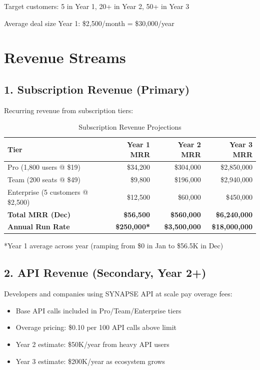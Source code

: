 \documentclass{report}
\begin{document}
Target customers: 5 in Year 1, 20+ in Year 2, 50+ in Year 3

Average deal size Year 1: \$2,500/month = \$30,000/year

\section{Revenue Streams}

\subsection{1. Subscription Revenue (Primary)}

Recurring revenue from subscription tiers:

\begin{table}[h]
\centering
\begin{tabular}{|l|r|r|r|}
\toprule
\textbf{Tier} & \textbf{Year 1 MRR} & \textbf{Year 2 MRR} & \textbf{Year 3 MRR} \\
\midrule
Pro (1,800 users @ \$19) & \$34,200 & \$304,000 & \$2,850,000 \\
Team (200 seats @ \$49) & \$9,800 & \$196,000 & \$2,940,000 \\
Enterprise (5 customers @ \$2,500) & \$12,500 & \$60,000 & \$450,000 \\
\midrule
\textbf{Total MRR (Dec)} & \textbf{\$56,500} & \textbf{\$560,000} & \textbf{\$6,240,000} \\
\textbf{Annual Run Rate} & \textbf{\$250,000*} & \textbf{\$3,500,000} & \textbf{\$18,000,000} \\
\bottomrule
\end{tabular}
\caption{Subscription Revenue Projections}
\end{table}

*Year 1 average across year (ramping from \$0 in Jan to \$56.5K in Dec)

\subsection{2. API Revenue (Secondary, Year 2+)}

Developers and companies using SYNAPSE API at scale pay overage fees:

\begin{itemize}
    \item Base API calls included in Pro/Team/Enterprise tiers
    \item Overage pricing: \$0.10 per 100 API calls above limit
    \item Year 2 estimate: \$50K/year from heavy API users
    \item Year 3 estimate: \$200K/year as ecosystem grows
\end{itemize}
\end{document}
